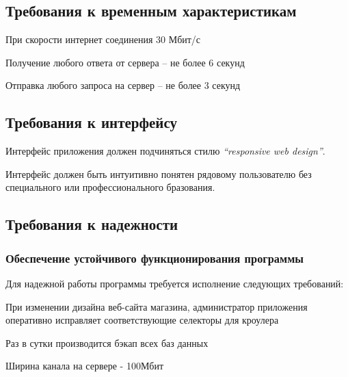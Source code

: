 \subsection{Требования к временным характеристикам}
При скорости интернет соединения 30 Мбит/с
\begin{my_enumerate}
  \item Получение любого ответа от сервера -- не более 6 секунд
  \item Отправка любого запроса на сервер -- не более 3 секунд
\end{my_enumerate}

\subsection{Требования к интерфейсу}
\begin{my_enumerate}
  \item Интерфейс приложения должен подчиняться стилю \textit{``responsive web design''}.\cite{caniuse}
  \item Интерфейс должен быть интуитивно понятен рядовому пользователю без
    специального или профессионального бразования.
\end{my_enumerate}

\subsection{Требования к надежности}
\subsubsection{Обеспечение устойчивого функционирования программы}
Для надежной работы программы требуется исполнение следующих требований:
\begin{my_enumerate}
  \item При изменении дизайна веб-сайта магазина, администратор приложения оперативно
    исправляет соответствующие селекторы для кроулера
  \item Раз в сутки производится бэкап всех баз данных
  \item Ширина канала на сервере - 100Мбит
\end{my_enumerate}

